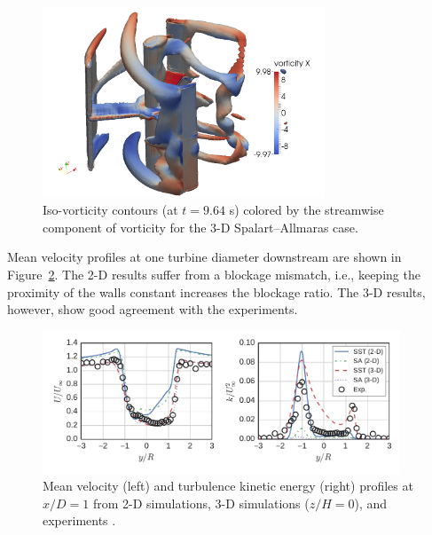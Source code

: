 \documentclass[aip,graphicx]{revtex4-1}
\begin{document}
\begin{figure}
    \centering

    \includegraphics[width=0.75\textwidth]{3D_vorticity_SA_964_10-threshold}

    \caption{Iso-vorticity contours (at $t=9.64$ s) colored by the streamwise
        component of vorticity for the 3-D Spalart--Allmaras case.}

    \label{fig:br-vorticity-3d}
\end{figure}

Mean velocity profiles at one turbine diameter downstream are shown in
Figure~\ref{fig:br-cfd-profiles}. The 2-D results suffer from a blockage
mismatch, i.e., keeping the proximity of the walls constant increases the
blockage ratio. The 3-D results, however, show good agreement with the
experiments.

\begin{figure}
    \centering

    \includegraphics[width=0.95\textwidth]{profiles}

    \caption{Mean velocity (left) and turbulence kinetic energy (right) profiles
        at $x/D=1$ from 2-D simulations, 3-D simulations ($z/H=0$), and experiments
        \cite{Bachant2015-JoT}.}

    \label{fig:br-cfd-profiles}
\end{figure}
\end{document}
